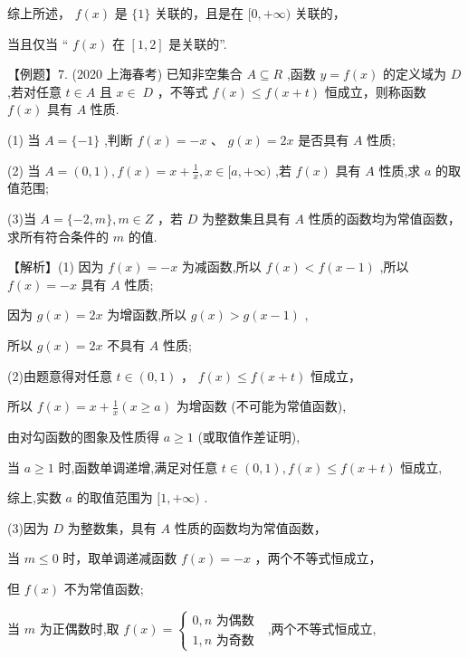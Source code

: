 \documentclass[10pt]{article}
\begin{document}
综上所述， \(f\left( x\right)\) 是 \(\{ 1\}\) 关联的，且是在 \(\lbrack 0, + \infty )\) 关联的，

当且仅当 “ \(f\left( x\right)\) 在 \(\left\lbrack  {1,2}\right\rbrack\) 是关联的”.

【例题】7. (2020 上海春考) 已知非空集合 \(A \subseteq  R\) ,函数 \(y = f\left( x\right)\) 的定义域为 \(D\) ,若对任意 \(t \in  A\) 且 \(x \in \; D\) ，不等式 \(f\left( x\right)  \leq  f\left( {x + t}\right)\) 恒成立，则称函数 \(f\left( x\right)\) 具有 \(A\) 性质.

(1) 当 \(A = \{  - 1\}\) ,判断 \(f\left( x\right)  =  - x\text{ 、 }g\left( x\right)  = {2x}\) 是否具有 \(A\) 性质;

(2) 当 \(A = \left( {0,1}\right) ,f\left( x\right)  = x + \frac{1}{x},x \in  \lbrack a, + \infty )\) ,若 \(f\left( x\right)\) 具有 \(A\) 性质,求 \(a\) 的取值范围;

(3)当 \(A = \{  - 2,m\} ,m \in  Z\) ，若 \(D\) 为整数集且具有 \(A\) 性质的函数均为常值函数，求所有符合条件的 \(m\) 的值.

【解析】(1) 因为 \(f\left( x\right)  =  - x\) 为减函数,所以 \(f\left( x\right)  < f\left( {x - 1}\right)\) ,所以 \(f\left( x\right)  =  - x\) 具有 \(A\) 性质;

因为 \(g\left( x\right)  = {2x}\) 为增函数,所以 \(g\left( x\right)  > g\left( {x - 1}\right)\) ,

所以 \(g\left( x\right)  = {2x}\) 不具有 \(A\) 性质;

(2)由题意得对任意 \(t \in  \left( {0,1}\right)\) ， \(f\left( x\right)  \leq  f\left( {x + t}\right)\) 恒成立，

所以 \(f\left( x\right)  = x + \frac{1}{x}\left( {x \geq  a}\right)\) 为增函数 (不可能为常值函数),

由对勾函数的图象及性质得 \(a \geq  1\) (或取值作差证明),

当 \(a \geq  1\) 时,函数单调递增,满足对任意 \(t \in  \left( {0,1}\right) ,f\left( x\right)  \leq  f\left( {x + t}\right)\) 恒成立,

综上,实数 \(a\) 的取值范围为 \(\lbrack 1, + \infty )\) .

(3)因为 \(D\) 为整数集，具有 \(A\) 性质的函数均为常值函数，

当 \(m \leq  0\) 时，取单调递减函数 \(f\left( x\right)  =  - x\) ，两个不等式恒成立，

但 \(f\left( x\right)\) 不为常值函数;

当 \(m\) 为正偶数时,取 \(f\left( x\right)  = \left\{  \begin{array}{l} 0,n\text{ 为偶数 } \\  1,n\text{ 为奇数 } \end{array}\right.\) ,两个不等式恒成立,
\end{document}
